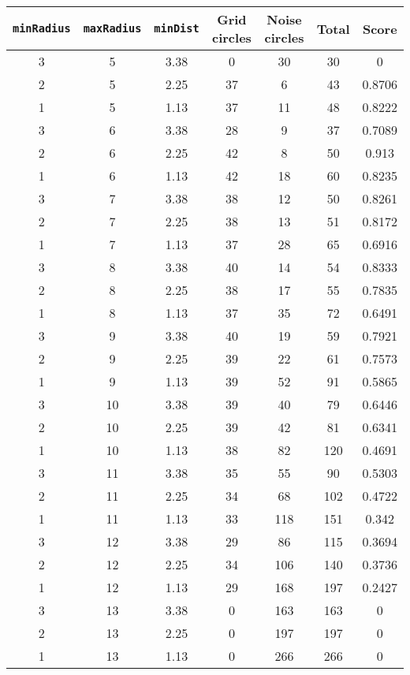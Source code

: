 \documentclass[letterpaper, 12pt]{article}
\begin{document}
\begin{longtable}{|c|c|c|c|c|c|c|}
\hline
\textbf{\texttt{minRadius}} & \textbf{\texttt{maxRadius}} & \textbf{\texttt{minDist}} & \textbf{Grid circles} & \textbf{Noise circles} & \textbf{Total} & \textbf{Score} \\
\hline
3 & 5 & 3.38 & 0 & 30 & 30 & 0 \\
\hline
2 & 5 & 2.25 & 37 & 6 & 43 & 0.8706 \\
\hline
1 & 5 & 1.13 & 37 & 11 & 48 & 0.8222 \\
\hline
3 & 6 & 3.38 & 28 & 9 & 37 & 0.7089 \\
\hline
2 & 6 & 2.25 & 42 & 8 & 50 & 0.913 \\
\hline
1 & 6 & 1.13 & 42 & 18 & 60 & 0.8235 \\
\hline
3 & 7 & 3.38 & 38 & 12 & 50 & 0.8261 \\
\hline
2 & 7 & 2.25 & 38 & 13 & 51 & 0.8172 \\
\hline
1 & 7 & 1.13 & 37 & 28 & 65 & 0.6916 \\
\hline
3 & 8 & 3.38 & 40 & 14 & 54 & 0.8333 \\
\hline
2 & 8 & 2.25 & 38 & 17 & 55 & 0.7835 \\
\hline
1 & 8 & 1.13 & 37 & 35 & 72 & 0.6491 \\
\hline
3 & 9 & 3.38 & 40 & 19 & 59 & 0.7921 \\
\hline
2 & 9 & 2.25 & 39 & 22 & 61 & 0.7573 \\
\hline
1 & 9 & 1.13 & 39 & 52 & 91 & 0.5865 \\
\hline
3 & 10 & 3.38 & 39 & 40 & 79 & 0.6446 \\
\hline
2 & 10 & 2.25 & 39 & 42 & 81 & 0.6341 \\
\hline
1 & 10 & 1.13 & 38 & 82 & 120 & 0.4691 \\
\hline
3 & 11 & 3.38 & 35 & 55 & 90 & 0.5303 \\
\hline
2 & 11 & 2.25 & 34 & 68 & 102 & 0.4722 \\
\hline
1 & 11 & 1.13 & 33 & 118 & 151 & 0.342 \\
\hline
3 & 12 & 3.38 & 29 & 86 & 115 & 0.3694 \\
\hline
2 & 12 & 2.25 & 34 & 106 & 140 & 0.3736 \\
\hline
1 & 12 & 1.13 & 29 & 168 & 197 & 0.2427 \\
\hline
3 & 13 & 3.38 & 0 & 163 & 163 & 0 \\
\hline
2 & 13 & 2.25 & 0 & 197 & 197 & 0 \\
\hline
1 & 13 & 1.13 & 0 & 266 & 266 & 0 \\

\end{longtable}
\end{document}
